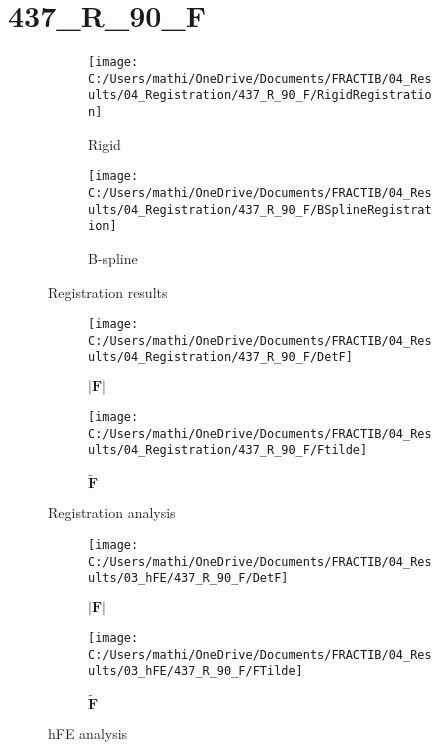 \documentclass{article}%
\begin{document}
%
\newpage%
\section*{437\_R\_90\_F}%
\label{sec:437R90F}%


\begin{figure}[h!]%
\begin{subfigure}[b]{0.5\linewidth}%
\texttt{[image: C:/Users/mathi/OneDrive/Documents/FRACTIB/04\_Results/04\_Registration/437\_R\_90\_F/RigidRegistration]}%
\caption{Rigid}%
\end{subfigure}%
\begin{subfigure}[b]{0.5\linewidth}%
\texttt{[image: C:/Users/mathi/OneDrive/Documents/FRACTIB/04\_Results/04\_Registration/437\_R\_90\_F/BSplineRegistration]}%
\caption{B{-}spline}%
\end{subfigure}%
\caption{Registration results}%
\end{figure}

%


\begin{figure}[h!]%
\begin{subfigure}[b]{0.5\linewidth}%
\texttt{[image: C:/Users/mathi/OneDrive/Documents/FRACTIB/04\_Results/04\_Registration/437\_R\_90\_F/DetF]}%
\caption{$|\mathbf{F}|$}%
\end{subfigure}%
\begin{subfigure}[b]{0.5\linewidth}%
\texttt{[image: C:/Users/mathi/OneDrive/Documents/FRACTIB/04\_Results/04\_Registration/437\_R\_90\_F/Ftilde]}%
\caption{$\tilde{\mathbf{F}}$}%
\end{subfigure}%
\caption{Registration analysis}%
\end{figure}

%


\begin{figure}[h!]%
\begin{subfigure}[b]{0.5\linewidth}%
\texttt{[image: C:/Users/mathi/OneDrive/Documents/FRACTIB/04\_Results/03\_hFE/437\_R\_90\_F/DetF]}%
\caption{$|\mathbf{F}|$}%
\end{subfigure}%
\begin{subfigure}[b]{0.5\linewidth}%
\texttt{[image: C:/Users/mathi/OneDrive/Documents/FRACTIB/04\_Results/03\_hFE/437\_R\_90\_F/FTilde]}%
\caption{$\tilde{\mathbf{F}}$}%
\end{subfigure}%
\caption{hFE analysis}%
\end{figure}
\end{document}
